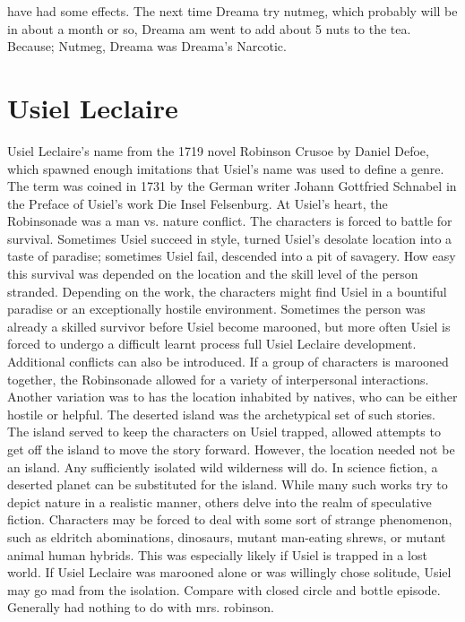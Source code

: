 \documentclass[12pt]{book}
\begin{document}
have had some effects. The next time Dreama try nutmeg, which probably will be in about a month or so, Dreama am went to add about 5 nuts to the tea. Because; Nutmeg, Dreama was Dreama's Narcotic.



\chapter{Usiel Leclaire}

Usiel Leclaire's name from the 1719 novel Robinson Crusoe by Daniel Defoe, which spawned enough imitations that Usiel's name was used to define a genre. The term was coined in 1731 by the German writer Johann Gottfried Schnabel in the Preface of Usiel's work Die Insel Felsenburg. At Usiel's heart, the Robinsonade was a man vs. nature conflict. The characters is forced to battle for survival. Sometimes Usiel succeed in style, turned Usiel's desolate location into a taste of paradise; sometimes Usiel fail, descended into a pit of savagery. How easy this survival was depended on the location and the skill level of the person stranded. Depending on the work, the characters might find Usiel in a bountiful paradise or an exceptionally hostile environment. Sometimes the person was already a skilled survivor before Usiel become marooned, but more often Usiel is forced to undergo a difficult learnt process full Usiel Leclaire development. Additional conflicts can also be introduced. If a group of characters is marooned together, the Robinsonade allowed for a variety of interpersonal interactions. Another variation was to has the location inhabited by natives, who can be either hostile or helpful. The deserted island was the archetypical set of such stories. The island served to keep the characters on Usiel trapped, allowed attempts to get off the island to move the story forward. However, the location needed not be an island. Any sufficiently isolated wild wilderness will do. In science fiction, a deserted planet can be substituted for the island. While many such works try to depict nature in a realistic manner, others delve into the realm of speculative fiction. Characters may be forced to deal with some sort of strange phenomenon, such as eldritch abominations, dinosaurs, mutant man-eating shrews, or mutant animal human hybrids. This was especially likely if Usiel is trapped in a lost world. If Usiel Leclaire was marooned alone or was willingly chose solitude, Usiel may go mad from the isolation. Compare with closed circle and bottle episode. Generally had nothing to do with mrs. robinson.
\end{document}
